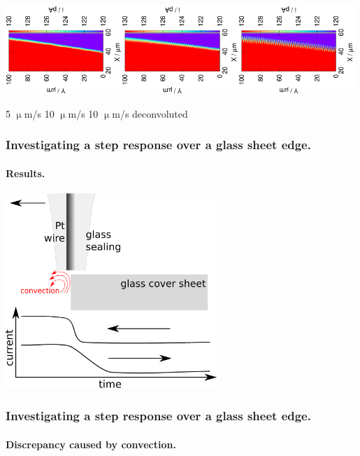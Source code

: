 \documentclass{beamer}
\begin{document}
\begin{frame}
        \centering
        \includegraphics[trim = 10mm 60mm 0mm 60mm, clip, width=0.33\textwidth, angle=-90]{1.eps}\includegraphics[trim = 10mm 60mm 0mm 60mm, clip, width=0.33\textwidth, angle=-90]{2_meandered.eps}\includegraphics[trim = 10mm 60mm 0mm 60mm, clip, width=0.33\textwidth, angle=-90]{2_meandered_deconvoluted.eps}

\hspace{1.2cm} 5 $\upmu$m/s \hspace{1.2cm} 10 $\upmu$m/s \hspace{0.2cm} 10 $\upmu$m/s deconvoluted \hfill

\frametitle{Investigating a step response over a glass sheet edge.}
        \framesubtitle{Results.}
\vfill
\end{frame}

\begin{frame}
        \centering
        \includegraphics[width=0.6\textwidth]{step_conv.eps}
        \frametitle{Investigating a step response over a glass sheet edge.}
        \framesubtitle{Discrepancy caused by convection.}
\vfill
\end{frame}
\end{document}
